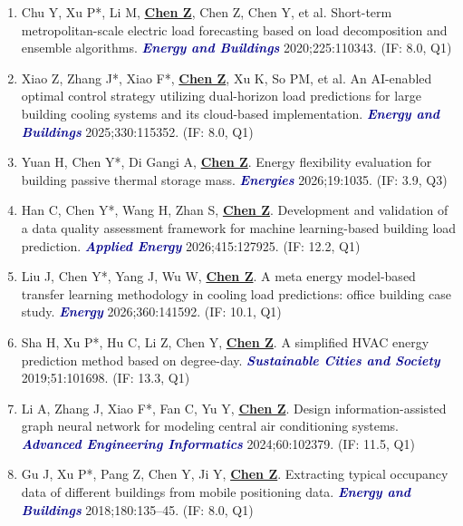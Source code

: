 \documentclass[11pt,a4paper]{article}
\newcommand{\me}[1]{\underline{\textbf{#1}}}
\newcommand{\journal}[1]{\textcolor{darkblue}{\textbf{\textit{#1}}}}
\begin{document}
\begin{enumerate}
\item Chu Y, Xu P*, Li M, \me{Chen Z}, Chen Z, Chen Y, et al. Short-term metropolitan-scale electric load forecasting based on load decomposition and ensemble algorithms. \journal{Energy and Buildings} 2020;225:110343. (IF: 8.0, Q1)

\item Xiao Z, Zhang J*, Xiao F*, \me{Chen Z}, Xu K, So PM, et al. An AI-enabled optimal control strategy utilizing dual-horizon load predictions for large building cooling systems and its cloud-based implementation. \journal{Energy and Buildings} 2025;330:115352. (IF: 8.0, Q1)

\item Yuan H, Chen Y*, Di Gangi A, \me{Chen Z}. Energy flexibility evaluation for building passive thermal storage mass. \journal{Energies} 2026;19:1035. (IF: 3.9, Q3)

\item Han C, Chen Y*, Wang H, Zhan S, \me{Chen Z}. Development and validation of a data quality assessment framework for machine learning-based building load prediction. \journal{Applied Energy} 2026;415:127925. (IF: 12.2, Q1)

\item Liu J, Chen Y*, Yang J, Wu W, \me{Chen Z}. A meta energy model-based transfer learning methodology in cooling load predictions: office building case study. \journal{Energy} 2026;360:141592. (IF: 10.1, Q1)

\item Sha H, Xu P*, Hu C, Li Z, Chen Y, \me{Chen Z}. A simplified HVAC energy prediction method based on degree-day. \journal{Sustainable Cities and Society} 2019;51:101698. (IF: 13.3, Q1)

\item Li A, Zhang J, Xiao F*, Fan C, Yu Y, \me{Chen Z}. Design information-assisted graph neural network for modeling central air conditioning systems. \journal{Advanced Engineering Informatics} 2024;60:102379. (IF: 11.5, Q1)

\item Gu J, Xu P*, Pang Z, Chen Y, Ji Y, \me{Chen Z}. Extracting typical occupancy data of different buildings from mobile positioning data. \journal{Energy and Buildings} 2018;180:135--45. (IF: 8.0, Q1)
\end{enumerate}
\end{document}
